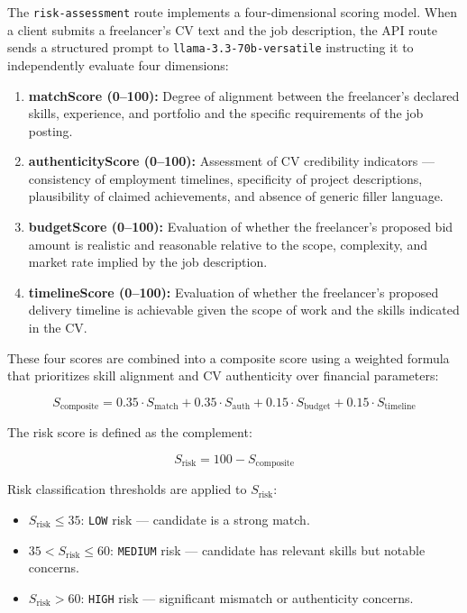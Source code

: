 The \texttt{risk-assessment} route implements a four-dimensional scoring model. When a client submits a freelancer's CV text and the job description, the API route sends a structured prompt to \texttt{llama-3.3-70b-versatile} instructing it to independently evaluate four dimensions:

\begin{enumerate}
    \item \textbf{matchScore (0--100):} Degree of alignment between the freelancer's declared skills, experience, and portfolio and the specific requirements of the job posting.
    \item \textbf{authenticityScore (0--100):} Assessment of CV credibility indicators --- consistency of employment timelines, specificity of project descriptions, plausibility of claimed achievements, and absence of generic filler language.
    \item \textbf{budgetScore (0--100):} Evaluation of whether the freelancer's proposed bid amount is realistic and reasonable relative to the scope, complexity, and market rate implied by the job description.
    \item \textbf{timelineScore (0--100):} Evaluation of whether the freelancer's proposed delivery timeline is achievable given the scope of work and the skills indicated in the CV.
\end{enumerate}

These four scores are combined into a composite score using a weighted formula that prioritizes skill alignment and CV authenticity over financial parameters:

\begin{equation}
    S_{\text{composite}} = 0.35 \cdot S_{\text{match}} + 0.35 \cdot S_{\text{auth}} + 0.15 \cdot S_{\text{budget}} + 0.15 \cdot S_{\text{timeline}}
\end{equation}

The risk score is defined as the complement:

\begin{equation}
    S_{\text{risk}} = 100 - S_{\text{composite}}
\end{equation}

Risk classification thresholds are applied to $S_{\text{risk}}$:
\begin{itemize}
    \item $S_{\text{risk}} \leq 35$: \texttt{LOW} risk --- candidate is a strong match.
    \item $35 < S_{\text{risk}} \leq 60$: \texttt{MEDIUM} risk --- candidate has relevant skills but notable concerns.
    \item $S_{\text{risk}} > 60$: \texttt{HIGH} risk --- significant mismatch or authenticity concerns.
\end{itemize}

